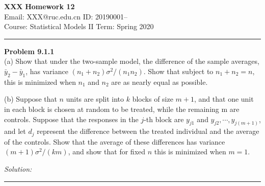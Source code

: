 \documentclass[a4paper, 11pt]{article}
\newenvironment{problem}[2][Problem]
    { \begin{mdframed}[backgroundcolor=gray!20] \textbf{#1 #2} \\}
    {  \end{mdframed}}
\newenvironment{solution}
    {\textit{Solution:}}
    {}
\begin{document}
\noindent
\large\textbf{XXX} \hfill \textbf{Homework 12}   \\
Email: XXX@ruc.edu.cn \hfill ID: 20190001-- \\
\normalsize Course: Statistical Models II \hfill Term: Spring 2020\\
\noindent\rule{7in}{2.8pt}
\begin{problem}{9.1.1}
(a) Show that under the two-sample model, the difference of the sample averages, $\bar{y}_{2}-\bar{y}_{1}$, has variance $\left(n_{1}+n_{2}\right) \sigma^{2} /\left(n_{1} n_{2}\right)$. Show that subject to $n_1 + n_2 = n$, this is minimized
when $n_1$ and $n_2$ are as nearly equal as possible.

(b) Suppose that $n$ units are split into $k$ blocks of size $m + 1$, and that one unit in each block is chosen at random to be treated, while the remaining m are controls. Suppose that the responses in the $j$-th block are $y_{j1}$ and $y_{j2},\cdots, y_{j(m+1)}$, and let $d_j$ represent the
difference between the treated individual and the average of the controls. Show that the
average of these differences has variance $(m+1) \sigma^{2} /(k m)$, and show that for fixed $n$ this is minimized when $m = 1$.
\end{problem}
\begin{solution}
\end{solution} 

\noindent\rule{7in}{2.8pt}
\end{document}
